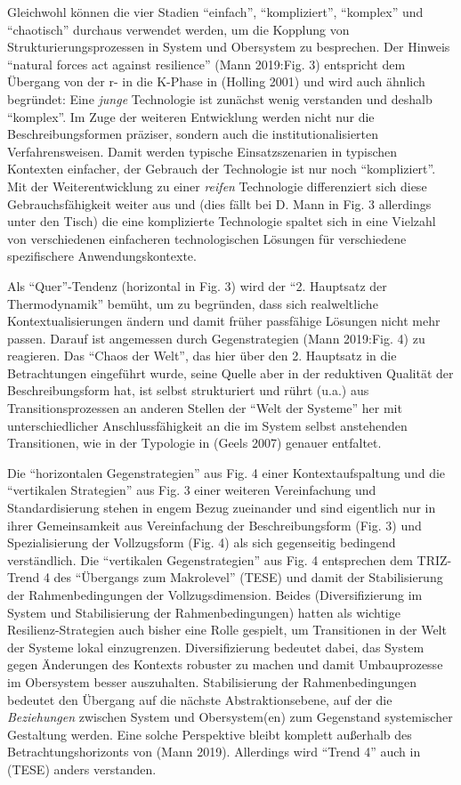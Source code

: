 \documentclass[11pt,a4paper]{article}
\begin{document}
Gleichwohl können die vier Stadien ``einfach'', ``kompliziert'',
``komplex'' und ``chaotisch'' durchaus verwendet werden, um die Kopplung
von Strukturierungsprozessen in System und Obersystem zu besprechen. Der
Hinweis ``natural forces act against resilience'' (Mann 2019:Fig. 3)
entspricht dem Übergang von der r- in die K-Phase in (Holling 2001) und
wird auch ähnlich begründet: Eine \emph{junge} Technologie ist zunächst
wenig verstanden und deshalb ``komplex''. Im Zuge der weiteren
Entwicklung werden nicht nur die Beschreibungsformen präziser, sondern
auch die institutionalisierten Verfahrensweisen. Damit werden typische
Einsatzszenarien in typischen Kontexten einfacher, der Gebrauch der
Technologie ist nur noch ``kompliziert''. Mit der Weiterentwicklung zu
einer \emph{reifen} Technologie differenziert sich diese
Gebrauchsfähigkeit weiter aus und (dies fällt bei D. Mann in Fig. 3
allerdings unter den Tisch) die eine komplizierte Technologie spaltet
sich in eine Vielzahl von verschiedenen einfacheren technologischen
Lösungen für verschiedene spezifischere Anwendungskontexte.

Als ``Quer''-Tendenz (horizontal in Fig. 3) wird der ``2. Hauptsatz der
Thermodynamik'' bemüht, um zu begründen, dass sich realweltliche
Kontextualisierungen ändern und damit früher passfähige Lösungen nicht
mehr passen. Darauf ist angemessen durch Gegenstrategien (Mann 2019:Fig.
4) zu reagieren. Das ``Chaos der Welt'', das hier über den 2. Hauptsatz
in die Betrachtungen eingeführt wurde, seine Quelle aber in der
reduktiven Qualität der Beschreibungsform hat, ist selbst strukturiert
und rührt (u.a.) aus Transitionsprozessen an anderen Stellen der ``Welt
der Systeme'' her mit unterschiedlicher Anschlussfähigkeit an die im
System selbst anstehenden Transitionen, wie in der Typologie in (Geels
2007) genauer entfaltet.

Die ``horizontalen Gegenstrategien'' aus Fig. 4 einer Kontextaufspaltung
und die ``vertikalen Strategien'' aus Fig. 3 einer weiteren
Vereinfachung und Standardisierung stehen in engem Bezug zueinander und
sind eigentlich nur in ihrer Gemeinsamkeit aus Vereinfachung der
Beschreibungsform (Fig. 3) und Spezialisierung der Vollzugsform (Fig. 4)
als sich gegenseitig bedingend verständlich. Die ``vertikalen
Gegenstrategien'' aus Fig. 4 entsprechen dem TRIZ-Trend 4 des
``Übergangs zum Makrolevel'' (TESE) und damit der Stabilisierung der
Rahmenbedingungen der Vollzugsdimension. Beides (Diversifizierung im
System und Stabilisierung der Rahmenbedingungen) hatten als wichtige
Resilienz-Strategien auch bisher eine Rolle gespielt, um Transitionen in
der Welt der Systeme lokal einzugrenzen. Diversifizierung bedeutet
dabei, das System gegen Änderungen des Kontexts robuster zu machen und
damit Umbauprozesse im Obersystem besser auszuhalten. Stabilisierung der
Rahmenbedingungen bedeutet den Übergang auf die nächste
Abstraktionsebene, auf der die \emph{Beziehungen} zwischen System und
Obersystem(en) zum Gegenstand systemischer Gestaltung werden. Eine
solche Perspektive bleibt komplett außerhalb des Betrachtungshorizonts
von (Mann 2019). Allerdings wird ``Trend 4'' auch in (TESE) anders
verstanden.
\end{document}
